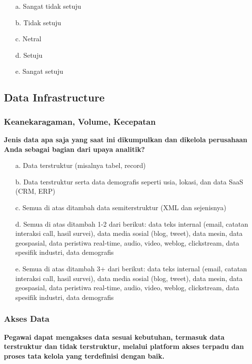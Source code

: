 \documentclass{article}
\begin{document}
\begin{enumerate}
	\item[a.] Sangat tidak setuju
	\item[b.] Tidak setuju
	\item[c.] Netral
	\item[d.] Setuju
	\item[e.] Sangat setuju
\end{enumerate}

\subsection{Data Infrastructure}

\subsubsection{Keanekaragaman, Volume, Kecepatan}

\textbf{Jenis data apa saja yang saat ini dikumpulkan dan dikelola perusahaan Anda sebagai bagian dari upaya analitik?}

\begin{enumerate}
	\item[a.] Data terstruktur (misalnya tabel, record)
	\item[b.] Data terstruktur serta data demografis seperti usia, lokasi, dan data SaaS (CRM, ERP)
	\item[c.] Semua di atas ditambah data semiterstruktur (XML dan sejenisnya)
	\item[d.] Semua di atas ditambah 1-2 dari berikut: data teks internal (email, catatan interaksi call, hasil survei), data media sosial (blog, tweet), data mesin, data geospasial, data peristiwa real-time, audio, video, weblog, clickstream, data spesifik industri, data demografis
	\item[e.] Semua di atas ditambah 3+ dari berikut: data teks internal (email, catatan interaksi call, hasil survei), data media sosial (blog, tweet), data mesin, data geospasial, data peristiwa real-time, audio, video, weblog, clickstream, data spesifik industri, data demografis
\end{enumerate}

\subsubsection{Akses Data}

\textbf{Pegawai dapat mengakses data sesuai kebutuhan, termasuk data terstruktur dan tidak terstruktur, melalui platform akses terpadu dan proses tata kelola yang terdefinisi dengan baik.}
\end{document}
